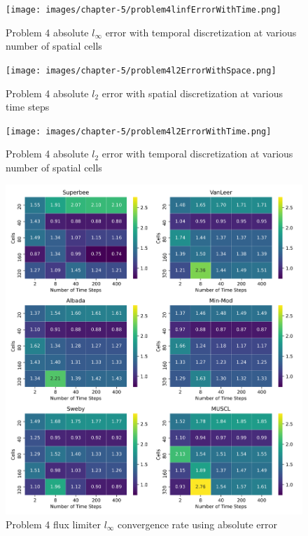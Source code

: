 \clearpage

\begin{figure}[p]
    \centering
    \texttt{[image: images/chapter-5/problem4linfErrorWithTime.png]}
    \caption{Problem 4 absolute $l_{\infty}$ error with temporal discretization at various number of spatial cells}
    \label{fig:problem4_linferror_time_results}
\end{figure}


\begin{figure}[p]
    \centering
    \texttt{[image: images/chapter-5/problem4l2ErrorWithSpace.png]}
    \caption{Problem 4 absolute $l_{2}$ error with spatial discretization at various time steps }
    \label{fig:problem4_l2error_spatial_results}
\end{figure}

\clearpage

\begin{figure}[p]
    \centering
    \texttt{[image: images/chapter-5/problem4l2ErrorWithTime.png]}
    \caption{Problem 4 absolute $l_{2}$ error with temporal discretization at various number of spatial cells}
    \label{fig:problem4_l2error_time_results}
\end{figure}

\clearpage

\begin{figure}[p]
    \centering
    \includegraphics[width=6in]{images/chapter-5/problem4linftyFluxLimiterConvergenceRate.png}
    \caption{Problem 4 flux limiter $l_{\infty}$ convergence rate using absolute error}
    \label{fig:problem4_linferror_fluxlimiter_convergence_rate}
\end{figure}

